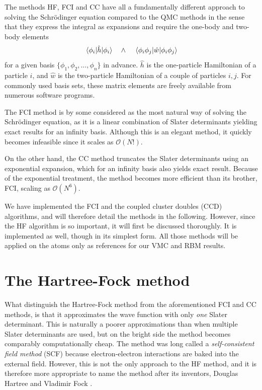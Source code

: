 The methods HF, FCI and CC have all a fundamentally different approach to solving the Schrödinger equation compared to the QMC methods in the sense that they express the integral as expansions and require the one-body and two-body elements
\begin{equation}
\mel{\phi_i}{\hat{h}}{\phi_i}\quad\wedge\quad\mel{\phi_i\phi_j}{\hat{w}}{\phi_i\phi_j}
\end{equation}
for a given basis $\{\phi_1,\phi_2,\hdots,\phi_n\}$ in advance. $\hat{h}$ is the one-particle Hamiltonian of a particle $i$, and $\hat{w}$ is the two-particle Hamiltonian of a couple of particles $i,j$. For commonly used basis sets, these matrix elements are freely available from numerous software programs. 

The FCI method is by some considered as the most natural way of solving the Schrödinger equation, as it is a linear combination of Slater determinants yielding exact results for an infinity basis. Although this is an elegant method, it quickly becomes infeasible since it scales as $\mathcal{O}(N!)$. 

On the other hand, the CC method truncates the Slater determinants using an exponential expansion, which for an infinity basis also yields exact result. Because of the exponential treatment, the method becomes more efficient than its brother, FCI, scaling as $\mathcal{O}(N^6)$.

We have implemented the FCI and the coupled cluster doubles (CCD) algorithms, and will therefore detail the methods in the following. However, since the HF algorithm is so important, it will first be discussed thoroughly. It is implemented as well, though in its simplest form. All those methods will be applied on the atoms only as references for our VMC and RBM results.

\section{The Hartree-Fock method}
What distinguish the Hartree-Fock method from the aforementioned FCI and CC methods, is that it approximates the wave function with only \textit{one} Slater determinant. This is naturally a poorer approximations than when multiple Slater determinants are used, but on the bright side the method becomes comparably computationally cheap. The method was long called a \textit{self-consistent field method} (SCF) because electron-electron interactions are baked into the external field. However, this is not the only approach to the HF method, and it is therefore more appropriate to name the method after its inventors, Douglas Hartree and Vladimir Fock \cite{hartree_wave_1928,fock_selfconsistent_1930}. 

